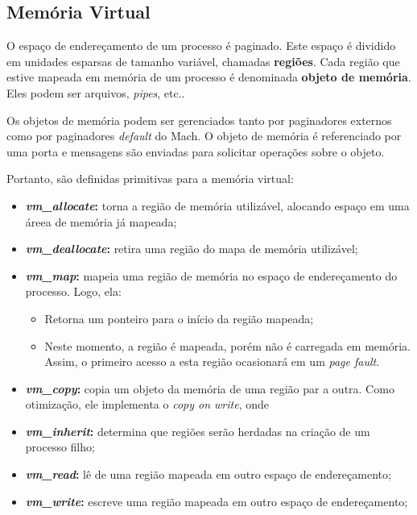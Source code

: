 \subsection{Memória Virtual}
O espaço de endereçamento de um processo é paginado. Este espaço é dividido em unidades esparsas de tamanho variável, chamadas \textbf{regiões}. Cada região que estive mapeada em memória de um processo é denominada \textbf{objeto de memória}. Eles podem ser arquivos, \textit{pipes}, etc..

Os objetos de memória podem ser gerenciados tanto por paginadores externos como por paginadores \textit{default} do Mach. O objeto de memória é referenciado por uma porta e mensagens são enviadas para solicitar operações sobre o objeto.

Portanto, são definidas primitivas para a memória virtual:
\begin{itemize}
  \item \textbf{\textit{vm_allocate}:} torna a região de memória utilizável, alocando espaço em uma áreea de memória já mapeada;

  \item \textbf{\textit{vm_deallocate}:} retira uma região do mapa de memória utilizável;

  \item \textbf{\textit{vm_map}:} mapeia uma região de memória no espaço de endereçamento do processo. Logo, ela:
  \begin{itemize}
    \item Retorna um ponteiro para o início da região mapeada;

    \item Neste momento, a região é mapeada, porém não é carregada em memória. Assim, o primeiro acesso a esta região ocasionará em um \textit{page fault}.
  \end{itemize}

  \item \textbf{\textit{vm_copy}:} copia um objeto da memória de uma região par a outra. Como otimização, ele implementa o \textit{copy on write}, onde %

  \item \textbf{\textit{vm_inherit}:} determina que regiões serão herdadas na criação de um processo filho;

  \item \textbf{\textit{vm_read}:} lê de uma região mapeada em outro espaço de endereçamento;

  \item \textbf{\textit{vm_write}:} escreve uma região mapeada em outro espaço de endereçamento;

\end{itemize}

